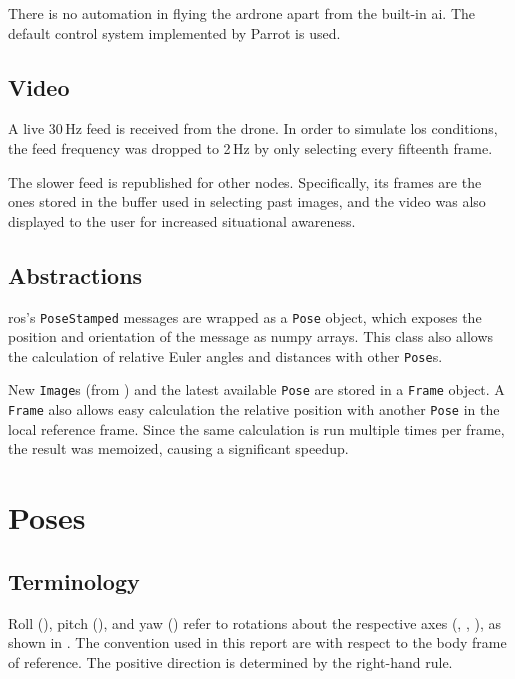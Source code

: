     There is no automation in flying the \gls{ardrone} apart from the built-in \gls{ai}.
    The default control system implemented by Parrot is used.

  \section{Video}
    A live 30\,Hz feed is received from the drone.
    In order to simulate \gls{los} conditions, the feed frequency was dropped to 2\,Hz by only selecting every fifteenth frame.

    The slower feed is republished for other nodes.
    Specifically, its frames are the ones stored in the buffer used in selecting past images, and the video was also displayed to the user for increased situational awareness.

  \section{Abstractions}
    \gls{ros}'s \texttt{PoseStamped} messages are wrapped as a \texttt{Pose} object, which exposes the position and orientation of the message as numpy arrays.
    This class also allows the calculation of relative Euler angles and distances with other \texttt{Pose}s.

    New \texttt{Image}s (from \textsf{}) and the latest available \texttt{Pose} are stored in a \texttt{Frame} object.
    A \texttt{Frame} also allows easy calculation the relative position with another \texttt{Pose} in the local reference frame.
    Since the same calculation is run multiple times per frame, the result was memoized, causing a significant speedup.
  

\chapter{Poses}
\label{sec:poses}
  \section{Terminology}
    Roll (), pitch (), and yaw () refer to rotations about the respective axes (, , ), as shown in .
    The convention used in this report are with respect to the body frame of reference. The positive direction is determined by the right-hand rule.

